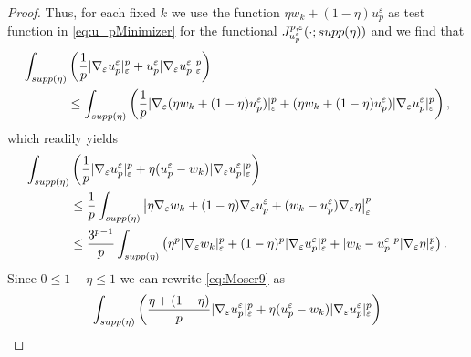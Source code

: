 \documentclass[10pt]{amsart}
\numberwithin{equation}{section}
\theoremstyle{definition}
\begin{document}
\begin{proof}
Thus, for each fixed $k$ we use the function $\eta w_{k} + (1-\eta) u_p^{\varepsilon}$ as test function in \eqref{eq:u_pMinimizer} for the functional $J^{p,\varepsilon}_{u^{\varepsilon}_{p}}(\cdot;\rm{supp}(\eta))$ and we find that
\begin{equation*}
\begin{aligned}
\int_{\rm{supp}(\eta)}&\left(\dfrac{1}{p}|\nabla_{\varepsilon}u_{p}^{\varepsilon}|_{\varepsilon}^p + u_{p}^{\varepsilon} |\nabla_{\varepsilon}u_{p}^{\varepsilon}|_{\varepsilon}^p \right)\\
&\leq \int_{\rm{supp}(\eta)}\left(\dfrac{1}{p}|\nabla_{\varepsilon}(\eta w_k + (1-\eta)u_{p}^{\varepsilon})|_{\varepsilon}^p + (\eta w_k + (1-\eta)u_{p}^{\varepsilon})|\nabla_{\varepsilon}u_{p}^{\varepsilon}|_{\varepsilon}^p \right),
\end{aligned}
\end{equation*}
\noindent which readily yields
\begin{equation}\label{eq:Moser9}
\begin{aligned}
\int_{\rm{supp}(\eta)}&\left( \dfrac{1}{p}|\nabla_{\varepsilon}u_{p}^{\varepsilon}|_{\varepsilon}^{p} + \eta (u_{p}^{\varepsilon}-w_k) |\nabla_{\varepsilon}u_{p}^{\varepsilon}|_{\varepsilon}^{p}\right)\\
&\leq \dfrac{1}{p}\int_{\rm{supp}(\eta)}\left| \eta \nabla_{\varepsilon}w_k + (1-\eta)\nabla_{\varepsilon}u_p^{\varepsilon} + (w_k-u_{p}^{\varepsilon})\nabla_{\varepsilon}\eta\right|_{\varepsilon}^{p}\\
&\leq \dfrac{3^{p-1}}{p}\int_{\rm{supp}(\eta)}\left( \eta^p |\nabla_{\varepsilon}w_k|_{\varepsilon}^{p} + (1-\eta)^p |\nabla_{\varepsilon}u_{p}^{\varepsilon}|_{\varepsilon}^{p} + |w_k-u_{p}^{\varepsilon}|^p |\nabla_{\varepsilon}\eta|_{\varepsilon}^{p}\right).
\end{aligned}
\end{equation}
Since $0\leq 1-\eta \leq 1$ we can rewrite \eqref{eq:Moser9} as 
\begin{equation*}
\begin{aligned}
\int_{\rm{supp}(\eta)}&\left( \dfrac{\eta +(1-\eta)}{p}|\nabla_{\varepsilon}u_{p}^{\varepsilon}|_{\varepsilon}^{p} + \eta (u_{p}^{\varepsilon}-w_k) |\nabla_{\varepsilon}u_{p}^{\varepsilon}|_{\varepsilon}^{p}\right)\\

\end{aligned}
\end{equation*}
\end{proof}
\end{document}
